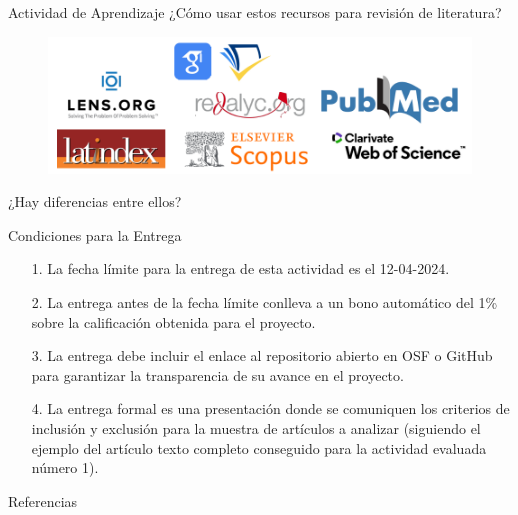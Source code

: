 \documentclass[aspectratio=169]{beamer}
\begin{document}
\begin{frame}{Actividad de Aprendizaje}
\centering
¿Cómo usar estos recursos para revisión de literatura?
\begin{figure}
\includegraphics[width=0.9\linewidth]{BasesDatos.png}
\end{figure}
¿Hay diferencias entre ellos?
\end{frame}

\begin{frame}{Condiciones para la Entrega}
\begin{itemize}
\item[1.] La fecha límite para la entrega de esta actividad es el 12-04-2024.
\item[2.] La entrega antes de la fecha límite conlleva a un bono automático del 1\% sobre la calificación obtenida para el proyecto.
\item[3.] La entrega debe incluir el enlace al repositorio abierto en OSF o GitHub para garantizar la transparencia de su avance en el proyecto. 
\item[4.] La entrega formal es una presentación donde se comuniquen los criterios de inclusión y exclusión para la muestra de artículos a analizar (siguiendo el ejemplo del artículo texto completo conseguido para la actividad evaluada número 1). 
\end{itemize}
\end{frame}



\begin{frame}[allowframebreaks]{Referencias}
\printbibliography[heading=none]
\end{frame}
\end{document}

